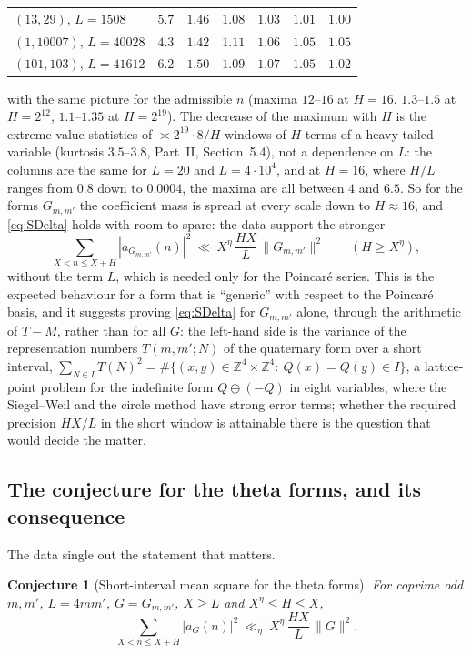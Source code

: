 \documentclass[11pt,a4paper]{article}
\newtheorem{conjecture}[theorem]{Conjecture}
\theoremstyle{remark}
\theoremstyle{definition}
\newcommand{\Z}{\mathbb Z}
\begin{document}
\begin{enumerate}[label=\textup{(\alph*)},leftmargin=2.2em]
\begin{center}
\begin{tabular}{l|cccccc}
$(13,29)$, $L=1508$ & $5.7$ & $1.46$ & $1.08$ & $1.03$ & $1.01$ & $1.00$\\
$(1,10007)$, $L=40028$ & $4.3$ & $1.42$ & $1.11$ & $1.06$ & $1.05$ & $1.05$\\
$(101,103)$, $L=41612$ & $6.2$ & $1.50$ & $1.09$ & $1.07$ & $1.05$ & $1.02$\\
\bottomrule
\end{tabular}
\end{center}
with the same picture for the admissible $n$ (maxima $12$--$16$ at $H=16$, $1.3$--$1.5$ at $H=2^{12}$, $1.1$--$1.35$ at $H=2^{19}$). The decrease of the maximum with $H$ is the extreme-value statistics of $\asymp2^{19}\cdot8/H$ windows of $H$ terms of a heavy-tailed variable (kurtosis $3.5$--$3.8$, Part~II, Section~5.4), not a dependence on $L$: the columns are the same for $L=20$ and $L=4\cdot10^4$, and at $H=16$, where $H/L$ ranges from $0.8$ down to $0.0004$, the maxima are all between $4$ and $6.5$. So for the forms $G_{m,m'}$ the coefficient mass is spread at every scale down to $H\approx16$, and \eqref{eq:SDelta} holds with room to spare: the data support the stronger
\[
\sum_{X<n\le X+H}|a_{G_{m,m'}}(n)|^2\ \ll\ X^{\eta}\,\frac{HX}{L}\,\|G_{m,m'}\|^2\qquad(H\ge X^{\eta}),
\]
without the term $L$, which is needed only for the Poincar\'e series. This is the expected behaviour for a form that is ``generic'' with respect to the Poincar\'e basis, and it suggests proving \eqref{eq:SDelta} for $G_{m,m'}$ alone, through the arithmetic of $T-M$, rather than for all $G$: the left-hand side is the variance of the representation numbers $T(m,m';N)$ of the quaternary form over a short interval, $\sum_{N\in I}T(N)^2=\#\{(x,y)\in\Z^4\times\Z^4:\ Q(x)=Q(y)\in I\}$, a lattice-point problem for the indefinite form $Q\oplus(-Q)$ in eight variables, where the Siegel--Weil and the circle method have strong error terms; whether the required precision $HX/L$ in the short window is attainable there is the question that would decide the matter.
\end{enumerate}

\subsection{The conjecture for the theta forms, and its consequence}
The data single out the statement that matters.

\begin{conjecture}[Short-interval mean square for the theta forms]\label{conj:short}
For coprime odd $m,m'$, $L=4mm'$, $G=G_{m,m'}$, $X\ge L$ and $X^{\eta}\le H\le X$,
\[
\sum_{X<n\le X+H}|a_G(n)|^2\ \ll_\eta\ X^{\eta}\,\frac{HX}{L}\,\|G\|^2 .
\]
\end{conjecture}
\end{document}
